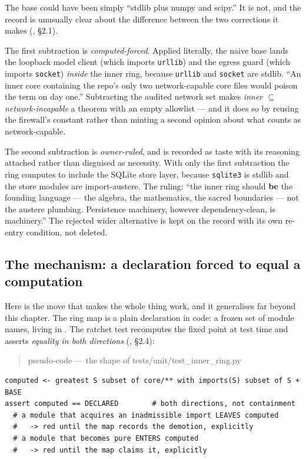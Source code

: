 The base could have been simply ``stdlib plus numpy and scipy.'' It is not, and the
record is unusually clear about the difference between the two corrections it makes
(, \S 2.1).

The first subtraction is \emph{computed-forced}. Applied literally, the naive base
lands the loopback model client (which imports \texttt{urllib}) and the egress guard
(which imports \texttt{socket}) \emph{inside} the inner ring, because
\texttt{urllib} and \texttt{socket} are stdlib. ``An inner core
containing the repo's only two network-capable core files would poison the term on
day one.'' Subtracting the audited network set makes \emph{inner $\subseteq$
network-incapable} a theorem with an empty allowlist --- and it does so by reusing
the firewall's constant rather than minting a second opinion about what counts as
network-capable.

The second subtraction is \emph{owner-ruled}, and is recorded as taste with its
reasoning attached rather than disguised as necessity. With only the first
subtraction the ring computes to include the SQLite store layer, because
\texttt{sqlite3} is stdlib and the store modules are import-austere. The ruling:
``the inner ring should \textbf{be} the founding language --- the algebra, the
mathematics, the sacred boundaries --- not the austere plumbing. Persistence
machinery, however dependency-clean, is machinery.'' The rejected wider alternative
is kept on the record with its own re-entry condition, not deleted.

\subsection*{The mechanism: a declaration forced to equal a computation}

Here is the move that makes the whole thing work, and it generalises far beyond
this chapter. The ring map is a plain declaration in code: a frozen set of module
names, living in
.
The ratchet test recomputes the fixed point at test time and asserts
\emph{equality in both directions}
(, \S 2.4):

\begin{quote}\small\ttfamily
pseudo-code --- the shape of tests/unit/test\_inner\_ring.py
\end{quote}
{\small\begin{verbatim}
computed <- greatest S subset of core/** with imports(S) subset of S + BASE
assert computed == DECLARED        # both directions, not containment
  # a module that acquires an inadmissible import LEAVES computed
  #   -> red until the map records the demotion, explicitly
  # a module that becomes pure ENTERS computed
  #   -> red until the map claims it, explicitly
\end{verbatim}}

